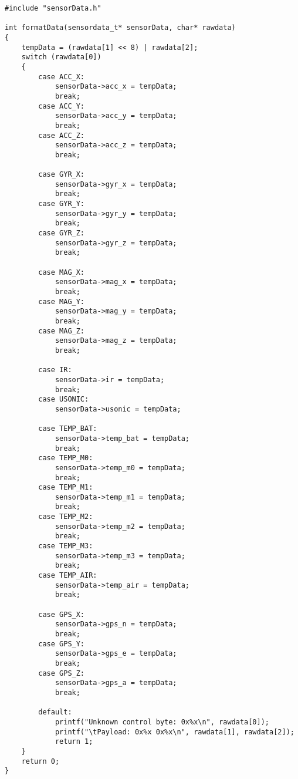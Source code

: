 \documentclass[a4paper,11pt]{article}
\begin{document}
\linespread{0.8}
\begin{lstlisting}
#include "sensorData.h"

int formatData(sensordata_t* sensorData, char* rawdata)
{
    tempData = (rawdata[1] << 8) | rawdata[2];
    switch (rawdata[0])
    {
        case ACC_X:
            sensorData->acc_x = tempData;
            break;
        case ACC_Y:
            sensorData->acc_y = tempData;
            break;
        case ACC_Z:
            sensorData->acc_z = tempData;
            break;
            
        case GYR_X:
            sensorData->gyr_x = tempData;
            break;
        case GYR_Y:
            sensorData->gyr_y = tempData;
            break;
        case GYR_Z:
            sensorData->gyr_z = tempData;
            break;
            
        case MAG_X:
            sensorData->mag_x = tempData;
            break;
        case MAG_Y:
            sensorData->mag_y = tempData;
            break;
        case MAG_Z:
            sensorData->mag_z = tempData;
            break;
        
        case IR:
            sensorData->ir = tempData;
            break;
        case USONIC:
            sensorData->usonic = tempData;
        
        case TEMP_BAT:
            sensorData->temp_bat = tempData;
            break;
        case TEMP_M0:
            sensorData->temp_m0 = tempData;
            break;
        case TEMP_M1:
            sensorData->temp_m1 = tempData;
            break;
        case TEMP_M2:
            sensorData->temp_m2 = tempData;
            break;
        case TEMP_M3:
            sensorData->temp_m3 = tempData;
            break;
        case TEMP_AIR:
            sensorData->temp_air = tempData;
            break;
            
        case GPS_X:
            sensorData->gps_n = tempData;
            break;
        case GPS_Y:
            sensorData->gps_e = tempData;
            break;
        case GPS_Z:
            sensorData->gps_a = tempData;
            break;
            
        default:
            printf("Unknown control byte: 0x%x\n", rawdata[0]);
            printf("\tPayload: 0x%x 0x%x\n", rawdata[1], rawdata[2]);
            return 1;
    }
    return 0;
}
\end{lstlisting}
\end{document}
